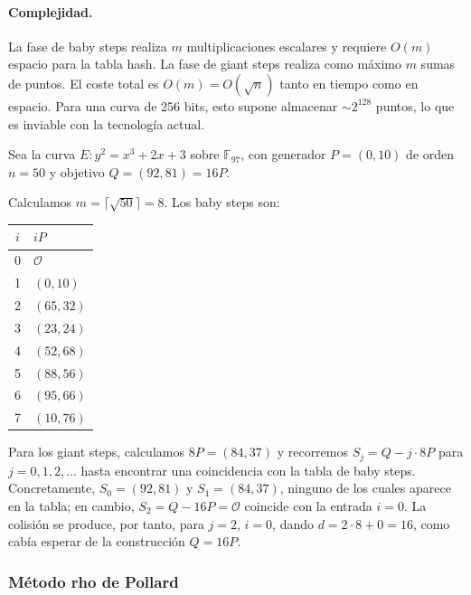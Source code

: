 \paragraph{Complejidad.}
La fase de baby steps realiza $m$ multiplicaciones escalares y requiere $O(m)$ espacio para la tabla hash. La fase de giant steps realiza como m\'aximo $m$ sumas de puntos. El coste total es $O(m) = O(\sqrt{n})$ tanto en tiempo como en espacio. Para una curva de 256 bits, esto supone almacenar $\sim 2^{128}$ puntos, lo que es inviable con la tecnolog\'ia actual.
 
\begin{ejemplo}
\label{ej:bsgs}
Sea la curva $E: y^2 = x^3 + 2x + 3$ sobre $\mathbb{F}_{97}$, con generador $P = (0, 10)$ de orden $n = 50$ y objetivo $Q = (92, 81) = 16P$.
 
Calculamos $m = \lceil\sqrt{50}\rceil = 8$. Los baby steps son:
\begin{center}
\begin{small}
\begin{tabular}{cl}
$i$ & $iP$ \\
\hline
0 & $\mathcal{O}$ \\
1 & $(0, 10)$ \\
2 & $(65, 32)$ \\
3 & $(23, 24)$ \\
4 & $(52, 68)$ \\
5 & $(88, 56)$ \\
6 & $(95, 66)$ \\
7 & $(10, 76)$ \\
\end{tabular}
\end{small}
\end{center}
 
Para los giant steps, calculamos $8P = (84, 37)$ y recorremos $S_j = Q - j \cdot 8P$ para $j=0,1,2,\dots$ hasta encontrar una coincidencia con la tabla de baby steps. Concretamente, $S_0 = (92, 81)$ y $S_1 = (84, 37)$, ninguno de los cuales aparece en la tabla; en cambio, $S_2 = Q - 16P = \mathcal{O}$ coincide con la entrada $i = 0$. La colisi\'on se produce, por tanto, para $j = 2$, $i = 0$, dando $d = 2 \cdot 8 + 0 = 16$, como cab\'ia esperar de la construcci\'on $Q = 16P$.
\end{ejemplo}


\subsubsection{Método rho de Pollard}
\label{subsubsec:pollard-rho}

